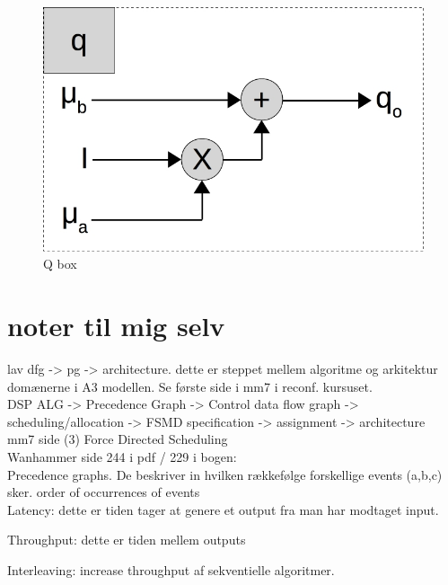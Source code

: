 \begin{figure}[ht!]
  \centering
  \includegraphics[scale=0.3]{figures/q_par}
  \caption{Q box}
  \label{fig:q_par}
\end{figure}

\color{gray}
\section*{noter til mig selv}
lav dfg -> pg -> architecture. dette er steppet mellem algoritme og arkitektur domænerne i A3 modellen. Se første side i mm7 i reconf. kursuset. \\ 


DSP ALG -> Precedence Graph -> Control data flow graph -> scheduling/allocation -> FSMD specification -> assignment -> architecture\\
mm7 side (3) Force Directed Scheduling\\

Wanhammer \cite{wanhammer1999} side 244 i pdf / 229 i bogen:\\
Precedence graphs. De beskriver in hvilken rækkefølge forskellige events (a,b,c) sker. order of occurrences of events\\
Latency: dette er tiden tager at genere et output fra man har modtaget input.

Throughput: dette er tiden mellem outputs

Interleaving: increase throughput af sekventielle algoritmer.



